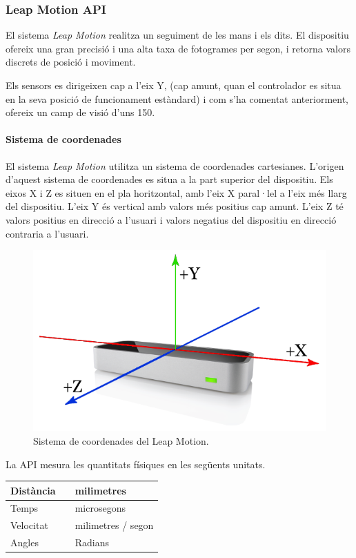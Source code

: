 \documentclass[12pt,a4paper,catalan]{article}
\begin{document}
	\subsubsection{Leap Motion API}
	El sistema \textit{Leap Motion} realitza un seguiment de les mans i els dits. El dispositiu ofereix una gran precisió i una alta taxa de fotogrames per segon, i retorna valors discrets de posició i moviment.
	
	Els sensors es dirigeixen cap a l'eix Y, (cap amunt, quan el controlador es situa en la seva posició de funcionament estàndard) i com s'ha comentat anteriorment, ofereix un camp de visió d'uns 150\textdegree.
	\paragraph{Sistema de coordenades}
	El sistema \textit{Leap Motion} utilitza un sistema de coordenades cartesianes. L'origen d'aquest sistema de coordenades es situa a la part superior del dispositiu. Els eixos X i Z es situen en el pla horitzontal, amb l'eix X paral·lel a l'eix més llarg del dispositiu. L'eix Y és vertical amb valors més positius cap amunt. L'eix Z té valors positius en direcció a l'usuari i valors negatius del dispositiu en direcció contraria a l'usuari.
	\begin{figure}[H]
		\includegraphics[width=\textwidth,keepaspectratio]{leap-coordinates.png}
		\centering
		\caption{Sistema de coordenades del Leap Motion.}
		\label{fig:leap-coordinates}
	\end{figure}
	La API mesura les quantitats físiques en les següents unitats.\\
	
	\begin{tabular}{ l c l }
		\hline
		Distància & & milimetres\\ \hline
		Temps & & microsegons\\ \hline
		Velocitat & &  milimetres / segon\\ \hline
		Angles & & Radians\\
	\end{tabular}
	
\end{document}
